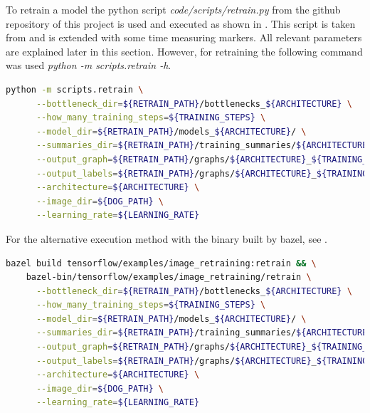To retrain a model the python script \textit{code/scripts/retrain.py} from the github repository of this project is used and executed as shown in . This script is taken from \citep{TensorflowDemo} and is extended with some time measuring markers. All relevant parameters are explained later in this section. However, for retraining the following command was used \textit{python -m scripts.retrain -h}. 

\begin{minipage}{\linewidth}
\begin{lstlisting}[caption=Call of \textit{retrain.py}, label=list:retrain, language=bash]
	python -m scripts.retrain \
	  --bottleneck_dir=${RETRAIN_PATH}/bottlenecks_${ARCHITECTURE} \
	  --how_many_training_steps=${TRAINING_STEPS} \
	  --model_dir=${RETRAIN_PATH}/models_${ARCHITECTURE}/ \
	  --summaries_dir=${RETRAIN_PATH}/training_summaries/${ARCHITECTURE}_${TRAINING_STEPS}/${ARCHITECTURE}_${TRAINING_STEPS}_${LEARNING_RATE} \
	  --output_graph=${RETRAIN_PATH}/graphs/${ARCHITECTURE}_${TRAINING_STEPS}/retrained_dog_graph_${ARCHITECTURE}_${TRAINING_STEPS}_${LEARNING_RATE}.pb \
	  --output_labels=${RETRAIN_PATH}/graphs/${ARCHITECTURE}_${TRAINING_STEPS}/retrained_dog_labels_${ARCHITECTURE}_${TRAINING_STEPS}_${LEARNING_RATE}.txt \
	  --architecture=${ARCHITECTURE} \
	  --image_dir=${DOG_PATH} \
	  --learning_rate=${LEARNING_RATE}
\end{lstlisting}
\end{minipage}

For the alternative execution method with the binary built by bazel, see \listref{bretrain}.

\begin{minipage}{\linewidth}
\begin{lstlisting}[caption=Build and call of \textit{retrain}, label=list:bretrain, language=bash]
	bazel build tensorflow/examples/image_retraining:retrain && \
	bazel-bin/tensorflow/examples/image_retraining/retrain \
	  --bottleneck_dir=${RETRAIN_PATH}/bottlenecks_${ARCHITECTURE} \
	  --how_many_training_steps=${TRAINING_STEPS} \
	  --model_dir=${RETRAIN_PATH}/models_${ARCHITECTURE}/ \
	  --summaries_dir=${RETRAIN_PATH}/training_summaries/${ARCHITECTURE}_${TRAINING_STEPS}/${ARCHITECTURE}_${TRAINING_STEPS}_${LEARNING_RATE} \
	  --output_graph=${RETRAIN_PATH}/graphs/${ARCHITECTURE}_${TRAINING_STEPS}/retrained_dog_graph_${ARCHITECTURE}_${TRAINING_STEPS}_${LEARNING_RATE}.pb \
	  --output_labels=${RETRAIN_PATH}/graphs/${ARCHITECTURE}_${TRAINING_STEPS}/retrained_dog_labels_${ARCHITECTURE}_${TRAINING_STEPS}_${LEARNING_RATE}.txt \
	  --architecture=${ARCHITECTURE} \
	  --image_dir=${DOG_PATH} \
	  --learning_rate=${LEARNING_RATE}
\end{lstlisting}
\end{minipage}

